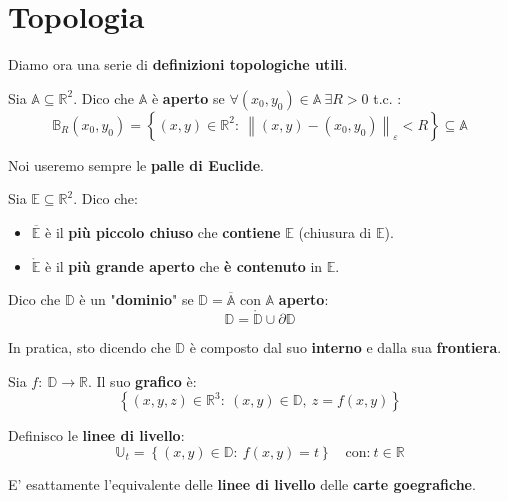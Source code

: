 \documentclass[a4paper, oneside]{article}
\newcommand\U{\mathbb{U}}
\newcommand\R{\mathbb{R}}
\newcommand\B{\mathbb{B}}
\newcommand\A{\mathbb{A}}
\newcommand\D{\mathbb{D}}
\newcommand\de{\partial}
\begin{document}
    \section{Topologia}
    Diamo ora una serie di \textbf{definizioni topologiche utili}.

    \begin{definition}
        Sia $\A\subseteq\R^2$. Dico che $\A$ è \textbf{aperto} se $\forall (x_0,y_0)\in\A \ \exists R>0$ t.c. :
        \[\B_R(x_0,y_0) = \left\{(x,y)\in\R^2: \ \left\lVert (x,y) - (x_0,y_0)\right\rVert_\varepsilon < R \right\} \subseteq \A\]
    \end{definition}
    \noindent Noi useremo sempre le \textbf{palle di Euclide}.

    \begin{definition}
        Sia $\mathbb{E}\subseteq\R^2$. Dico che:
        \begin{itemize}
            \item $\overline{\mathbb{E}}$ è il \textbf{più piccolo chiuso} che \textbf{contiene} $\mathbb{E}$ (chiusura di $\mathbb{E}$).
            \item $\mathring{\mathbb{E}}$ è il \textbf{più grande aperto} che \textbf{è contenuto} in $\mathbb{E}$. 
        \end{itemize}
    \end{definition}

    \begin{definition}
        Dico che $\D$ è un "\textbf{dominio}" se $\D=\overline{\A}$ con $\A$ \textbf{aperto}:
        \[ \D = \mathring{\D} \cup \de\D \]
    \end{definition}
    \noindent In pratica, sto dicendo che $\D$ è composto dal suo \textbf{interno} e dalla sua \textbf{frontiera}.

    \begin{definition}
        Sia $f: \ \D\to\R$. Il suo \textbf{grafico} è:
        \[\left\{(x,y,z)\in\R^3: \ (x,y)\in\D, \ z=f(x,y)\right\}\]
    \end{definition}

    \begin{definition}
        Definisco le \textbf{linee di livello}:
        \[\U_t = \left\{(x,y)\in\D: \ f(x,y) = t\right\} \quad\text{con:} \ t\in\R\]
    \end{definition}
    \noindent E' esattamente l'equivalente delle \textbf{linee di livello} delle \textbf{carte goegrafiche}.
\end{document}

